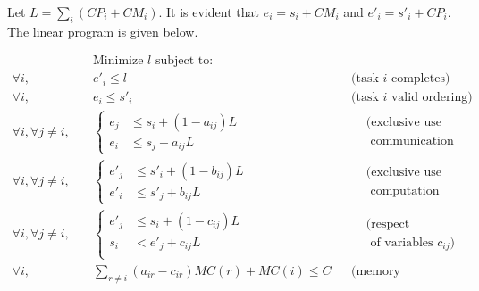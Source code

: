 \documentclass[runningheads]{llncs} %
\begin{document}




\noindent Let $L=\sum_i (CP_i + CM_i)$. It is evident that $e_i =s_i + CM_i$ and $e'_i =s'_i + CP_i$. The linear program is given below.

\vspace*{-0.5cm}
\begin{align*}
	& \text{Minimize $l$ subject to:}\\
	\forall i, \quad & e'_i \leq l && \text{(task $i$ completes)}\\
	\forall i, \quad & e_i \leq s'_i&& \text{(task $i$ valid ordering)}\\
	\forall i, \forall j\ne i, \quad & \left\{\begin{aligned}
		e_j & \leq s_i +(1-a_{ij})L\\
		e_i & \leq s_j +a_{ij}L 
	\end{aligned} \right. &&
	\begin{aligned}
		&\text{(exclusive use of}\\
		&\text{  communication link)}
	\end{aligned}\\
	\forall i, \forall j\ne i, \quad & \left\{
	\begin{aligned}
		e'_j &\leq s'_i +(1-b_{ij})L\\
		e'_i &\leq s'_j +b_{ij}L
	\end{aligned}\right. && 
	\begin{aligned}
		&\text{(exclusive use of}\\
		&\text{  computation resource)}
	\end{aligned}\\
	\forall i, \forall j\ne i, \quad &\left\{
	\begin{aligned}
		e'_j &\leq s_i +(1-c_{ij})L\\
		s_i  &< e'_j +c_{ij}L\\
	\end{aligned}\right.&&
	\begin{aligned}
		&\text{(respect ordering}\\
		&\text{ of variables $c_{ij}$)}
	\end{aligned}\\
	\forall i, \quad & \sum_{r\ne i} (a_{ir} - c_{ir})MC(r) + MC(i) \le C && \text{(memory constraint)}\\
\end{align*} 
\end{document}

